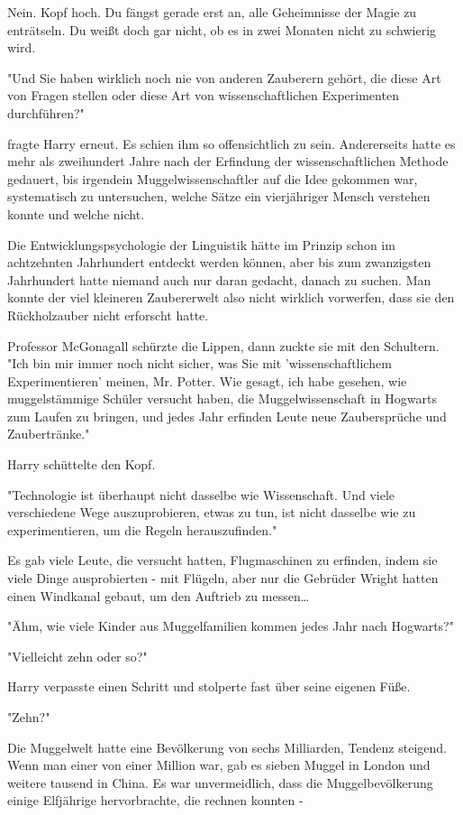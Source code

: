 {Nein. Kopf hoch. Du fängst gerade erst an, alle Geheimnisse der Magie zu enträtseln. Du weißt doch gar nicht, ob es in zwei Monaten nicht zu schwierig wird.

"Und Sie haben wirklich noch nie von anderen Zauberern gehört, die diese Art von Fragen stellen oder diese Art von wissenschaftlichen Experimenten durchführen?"

fragte Harry erneut. Es schien ihm so offensichtlich zu sein. Andererseits hatte es mehr als zweihundert Jahre nach der Erfindung der wissenschaftlichen Methode gedauert, bis irgendein Muggelwissenschaftler auf die Idee gekommen war, systematisch zu untersuchen, welche Sätze ein vierjähriger Mensch verstehen konnte und welche nicht.

Die Entwicklungspsychologie der Linguistik hätte im Prinzip schon im achtzehnten Jahrhundert entdeckt werden können, aber bis zum zwanzigsten Jahrhundert hatte niemand auch nur daran gedacht, danach zu suchen. Man konnte der viel kleineren Zaubererwelt also nicht wirklich vorwerfen, dass sie den Rückholzauber nicht erforscht hatte.

Professor McGonagall schürzte die Lippen, dann zuckte sie mit den Schultern.\\ "Ich bin mir immer noch nicht sicher, was Sie mit 'wissenschaftlichem Experimentieren' meinen, Mr. Potter. Wie gesagt, ich habe gesehen, wie muggelstämmige Schüler versucht haben, die Muggelwissenschaft in Hogwarts zum Laufen zu bringen, und jedes Jahr erfinden Leute neue Zaubersprüche und Zaubertränke."

Harry schüttelte den Kopf.

"Technologie ist überhaupt nicht dasselbe wie Wissenschaft. Und viele verschiedene Wege auszuprobieren, etwas zu tun, ist nicht dasselbe wie zu experimentieren, um die Regeln herauszufinden."

Es gab viele Leute, die versucht hatten, Flugmaschinen zu erfinden, indem sie viele Dinge ausprobierten - mit Flügeln, aber nur die Gebrüder Wright hatten einen Windkanal gebaut, um den Auftrieb zu messen…

"Ähm, wie viele Kinder aus Muggelfamilien kommen jedes Jahr nach Hogwarts?"

"Vielleicht zehn oder so?"

Harry verpasste einen Schritt und stolperte fast über seine eigenen Füße.

"Zehn?"

Die Muggelwelt hatte eine Bevölkerung von sechs Milliarden, Tendenz steigend. Wenn man einer von einer Million war, gab es sieben Muggel in London und weitere tausend in China. Es war unvermeidlich, dass die Muggelbevölkerung einige Elfjährige hervorbrachte, die rechnen konnten -

}

